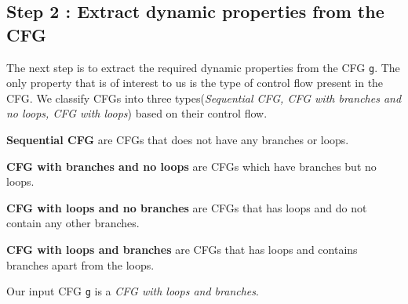 \subsection{Step 2 : Extract dynamic properties from the CFG}
The next step is to extract the required dynamic properties from the CFG \texttt{g}. The only property that is of interest to us is the type of control flow present in the CFG.
We classify CFGs into three types(\textit{Sequential CFG, CFG with branches and no loops, CFG with loops}) based on their control flow.
\begin{definition}
\textbf{Sequential CFG} are CFGs that does not have any branches or loops.
\end{definition}
\begin{definition}
\textbf{CFG with branches and no loops} are CFGs which have branches but no loops.
\end{definition}
\begin{definition}
\textbf{CFG with loops and no branches} are CFGs that has loops and do not contain any other branches.
\end{definition}
\begin{definition}
	\textbf{CFG with loops and branches} are CFGs that has loops and contains branches apart from the loops.
\end{definition}
Our input CFG \texttt{g} is a \textit{CFG with loops and branches}.

